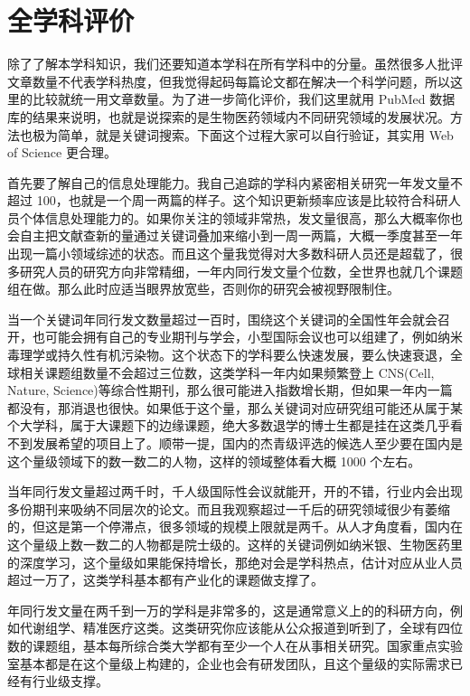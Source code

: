 \documentclass[]{tufte-book}
\begin{document}
\hypertarget{ux5168ux5b66ux79d1ux8bc4ux4ef7}{%
\section{全学科评价}\label{ux5168ux5b66ux79d1ux8bc4ux4ef7}}

除了了解本学科知识，我们还要知道本学科在所有学科中的分量。虽然很多人批评文章数量不代表学科热度，但我觉得起码每篇论文都在解决一个科学问题，所以这里的比较就统一用文章数量。为了进一步简化评价，我们这里就用 PubMed 数据库的结果来说明，也就是说探索的是生物医药领域内不同研究领域的发展状况。方法也极为简单，就是关键词搜索。下面这个过程大家可以自行验证，其实用 Web of Science 更合理。

首先要了解自己的信息处理能力。我自己追踪的学科内紧密相关研究一年发文量不超过 100，也就是一个周一两篇的样子。这个知识更新频率应该是比较符合科研人员个体信息处理能力的。如果你关注的领域非常热，发文量很高，那么大概率你也会自主把文献查新的量通过关键词叠加来缩小到一周一两篇，大概一季度甚至一年出现一篇小领域综述的状态。而且这个量我觉得对大多数科研人员还是超载了，很多研究人员的研究方向非常精细，一年内同行发文量个位数，全世界也就几个课题组在做。那么此时应适当眼界放宽些，否则你的研究会被视野限制住。

当一个关键词年同行发文数量超过一百时，围绕这个关键词的全国性年会就会召开，也可能会拥有自己的专业期刊与学会，小型国际会议也可以组建了，例如纳米毒理学或持久性有机污染物。这个状态下的学科要么快速发展，要么快速衰退，全球相关课题组数量不会超过三位数，这类学科一年内如果频繁登上 CNS(Cell, Nature, Science)等综合性期刊，那么很可能进入指数增长期，但如果一年内一篇都没有，那消退也很快。如果低于这个量，那么关键词对应研究组可能还从属于某个大学科，属于大课题下的边缘课题，绝大多数退学的博士生都是挂在这类几乎看不到发展希望的项目上了。顺带一提，国内的杰青级评选的候选人至少要在国内是这个量级领域下的数一数二的人物，这样的领域整体看大概 1000 个左右。

当年同行发文量超过两千时，千人级国际性会议就能开，开的不错，行业内会出现多份期刊来吸纳不同层次的论文。而且我观察超过一千后的研究领域很少有萎缩的，但这是第一个停滞点，很多领域的规模上限就是两千。从人才角度看，国内在这个量级上数一数二的人物都是院士级的。这样的关键词例如纳米银、生物医药里的深度学习，这个量级如果能保持增长，那绝对会是学科热点，估计对应从业人员超过一万了，这类学科基本都有产业化的课题做支撑了。

年同行发文量在两千到一万的学科是非常多的，这是通常意义上的的科研方向，例如代谢组学、精准医疗这类。这类研究你应该能从公众报道到听到了，全球有四位数的课题组，基本每所综合类大学都有至少一个人在从事相关研究。国家重点实验室基本都是在这个量级上构建的，企业也会有研发团队，且这个量级的实际需求已经有行业级支撑。
\end{document}
